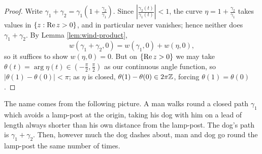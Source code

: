\documentclass[a4paper]{scrartcl}
\begin{document}
\begin{proof}
	Write $\gamma_1+\gamma_2 = \gamma_1\left(1+\frac{\gamma_2}{\gamma_1}\right)$. Since $\left|\frac{\gamma_2(t)}{\gamma_1(t)}\right|<1$, the curve $\eta = 1+\frac{\gamma_2}{\gamma_1}$ takes values in $\{z : \operatorname{Re} z>0\}$, and in particular never vanishes; hence neither does $\gamma_1+\gamma_2$. By Lemma \ref{lem:wind-product},
	$$w(\gamma_1+\gamma_2,0) = w(\gamma_1,0)+w(\eta,0),$$
	so it suffices to show $w(\eta,0)=0$. But on $\{\operatorname{Re} z>0\}$ we may take $\theta(t) = \arg\eta(t)\in(-\tfrac\pi2,\tfrac\pi2)$ as our continuous angle function, so $|\theta(1)-\theta(0)|<\pi$; as $\eta$ is closed, $\theta(1)-\theta(0)\in2\pi\mathbb{Z}$, forcing $\theta(1)=\theta(0)$.
\end{proof}

The name comes from the following picture. A man walks round a closed path $\gamma_1$ which avoids a lamp-post at the origin, taking his dog with him on a lead of length always shorter than his own distance from the lamp-post. The dog's path is $\gamma_1+\gamma_2$. Then, however much the dog dashes about, man and dog go round the lamp-post the same number of times.
\end{document}
